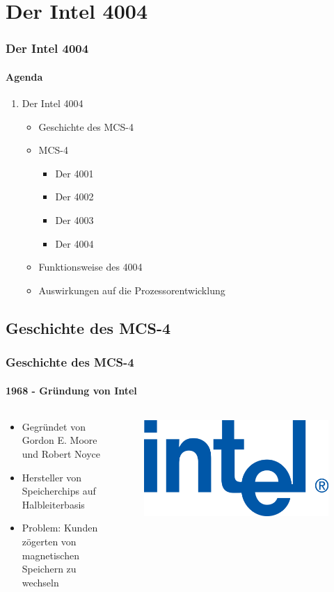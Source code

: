 \section{Der Intel 4004}

\begin{frame}
	\frametitle{Der Intel 4004}
	\framesubtitle{Agenda}
	\begin{enumerate}
		\item Der Intel 4004
		\begin{itemize}
			\item Geschichte des MCS-4
			\item MCS-4
			\begin{itemize}
				\item Der 4001
				\item Der 4002
				\item Der 4003
				\item Der 4004
			\end{itemize}
			\item Funktionsweise des 4004
			\item Auswirkungen auf die Prozessorentwicklung
		\end{itemize}
	\end{enumerate}
\end{frame}

\subsection{Geschichte des MCS-4}

\begin{frame}
	\frametitle{Geschichte des MCS-4}
	\framesubtitle{1968 - Gründung von Intel}
	\begin{columns}[c]
		    \begin{column}{.5\textwidth}
		    	\begin{itemize}
		    		\item Gegründet von Gordon E. Moore und Robert Noyce
		    		\item Hersteller von Speicherchips auf Halbleiterbasis
		    		\item Problem: Kunden zögerten von magnetischen Speichern zu wechseln
		    	\end{itemize}
		    \end{column}
		    \begin{column}{.5\textwidth}
		    	\begin{figure}
		    	    \includegraphics[width=0.7\linewidth]{images/old_intel_logo.png}
		    	\end{figure}
		    \end{column}
	\end{columns}
\end{frame}

